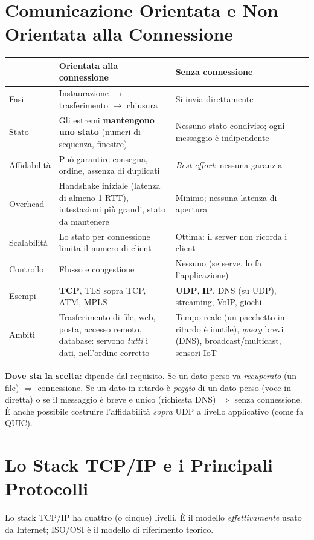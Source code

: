 \section{Comunicazione Orientata e Non Orientata alla Connessione}
\begin{center}
\small
\begin{tabularx}{\textwidth}{@{}>{\raggedright\arraybackslash}p{2.6cm}XX@{}}
\toprule
 & \textbf{Orientata alla connessione} & \textbf{Senza connessione} \\
\midrule
Fasi & Instaurazione $\to$ trasferimento $\to$ chiusura & Si invia direttamente \\
Stato & Gli estremi \textbf{mantengono uno stato} (numeri di sequenza, finestre) & Nessuno stato condiviso; ogni messaggio è indipendente \\
Affidabilità & Può garantire consegna, ordine, assenza di duplicati & \emph{Best effort}: nessuna garanzia \\
Overhead & Handshake iniziale (latenza di almeno 1 RTT), intestazioni più grandi, stato da mantenere & Minimo; nessuna latenza di apertura \\
Scalabilità & Lo stato per connessione limita il numero di client & Ottima: il server non ricorda i client \\
Controllo & Flusso e congestione & Nessuno (se serve, lo fa l'applicazione) \\
Esempi & \textbf{TCP}, TLS sopra TCP, ATM, MPLS & \textbf{UDP}, \textbf{IP}, DNS (su UDP), streaming, VoIP, giochi \\
Ambiti & Trasferimento di file, web, posta, accesso remoto, database: servono \emph{tutti} i dati, nell'ordine corretto & Tempo reale (un pacchetto in ritardo è inutile), \emph{query} brevi (DNS), broadcast/multicast, sensori IoT \\
\bottomrule
\end{tabularx}
\end{center}
\textbf{Dove sta la scelta}: dipende dal requisito. Se un dato perso va \emph{recuperato} (un file) $\Rightarrow$ connessione. Se un dato in ritardo è \emph{peggio} di un dato perso (voce in diretta) o se il messaggio è breve e unico (richiesta DNS) $\Rightarrow$ senza connessione. È anche possibile costruire l'affidabilità \emph{sopra} UDP a livello applicativo (come fa QUIC).

\section{Lo Stack TCP/IP e i Principali Protocolli}
Lo stack TCP/IP ha quattro (o cinque) livelli. È il modello \emph{effettivamente} usato da Internet; ISO/OSI è il modello di riferimento teorico.

